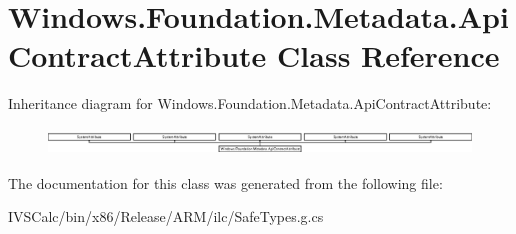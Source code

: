 \hypertarget{class_windows_1_1_foundation_1_1_metadata_1_1_api_contract_attribute}{}\section{Windows.\+Foundation.\+Metadata.\+Api\+Contract\+Attribute Class Reference}
\label{class_windows_1_1_foundation_1_1_metadata_1_1_api_contract_attribute}
Inheritance diagram for Windows.\+Foundation.\+Metadata.\+Api\+Contract\+Attribute\+:\begin{figure}[H]
\begin{center}
\leavevmode
\includegraphics[height=0.720257cm]{class_windows_1_1_foundation_1_1_metadata_1_1_api_contract_attribute}
\end{center}
\end{figure}


The documentation for this class was generated from the following file\+:\begin{DoxyCompactItemize}
\item 
I\+V\+S\+Calc/bin/x86/\+Release/\+A\+R\+M/ilc/Safe\+Types.\+g.\+cs\end{DoxyCompactItemize}
